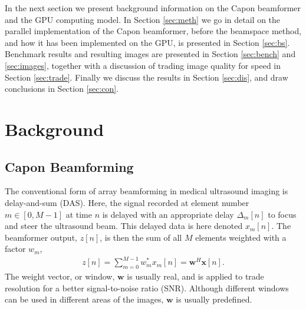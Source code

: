 \documentclass[journal]{IEEEtran}
\renewcommand{\vec}[1]{\mathbf{#1}}
\begin{document}
In the next section we present background information on the Capon beamformer and the GPU computing model. In Section \ref{sec:meth} we go in detail on the parallel implementation of the Capon beamformer, before the beamspace method, and how it has been implemented on the GPU, is presented in Section \ref{sec:bs}. Benchmark results and resulting images are presented in Section \ref{sec:bench} and \ref{sec:images}, together with a discussion of trading image quality for speed in Section \ref{sec:trade}.  Finally we discuss the results in Section \ref{sec:dis}, and draw conclusions in Section \ref{sec:con}. 

\section{Background}

\subsection{Capon Beamforming}






The conventional form of array beamforming in medical ultrasound imaging is delay-and-sum (DAS). Here, the signal recorded at element number $m \in [0,M-1]$ at time $n$ is delayed with an appropriate delay $\Delta_m[n]$ to focus and steer the ultrasound beam. This delayed data is here denoted $x_m[n]$. The beamformer output, $z[n]$, is then the sum of all $M$ elements weighted with a factor $w_m$,
\begin{align}
z[n] = \sum_{m = 0}^{M-1}w_m^*x_m[n] = \vec{w}^H\vec{x}[n]. \label{eq:z}
\end{align}
The weight vector, or window, $\vec{w}$ is usually real, and is applied to trade resolution for a better signal-to-noise ratio (SNR). Although different windows can be used in different areas of the images, $\vec{w}$ is usually predefined.
\end{document}
